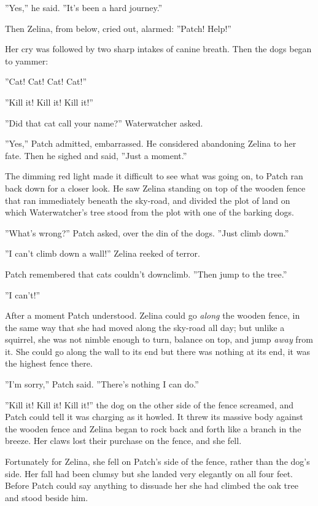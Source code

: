 \documentclass[12pt]{book}
\begin{document}
''Yes,'' he said. ''It's been a hard journey.''\par
Then Zelina, from below, cried out, alarmed: ''Patch! Help!''\par
Her cry was followed by two sharp intakes of canine breath. Then the dogs began to yammer:\par
''Cat! Cat! Cat! Cat!''\par
''Kill it! Kill it! Kill it!''\par
''Did that cat call your name?'' Waterwatcher asked.\par
''Yes,'' Patch admitted, embarrassed. He considered abandoning Zelina to her fate. Then he sighed and said, ''Just a moment.''\par
The dimming red light made it difficult to see what was going on, to Patch ran back down for a closer look. He saw Zelina standing on top of the wooden fence that ran immediately beneath the sky-road, and divided the plot of land on which Waterwatcher's tree stood from the plot with one of the barking dogs.\par
''What's wrong?'' Patch asked, over the din of the dogs. ''Just climb down.''\par
''I can't climb down a wall!'' Zelina reeked of terror.\par
Patch remembered that cats couldn't downclimb. ''Then jump to the tree.''\par
''I can't!''\par
After a moment Patch understood. Zelina could go {\it along} the wooden fence, in the same way that she had moved along the sky-road all day; but unlike a squirrel, she was not nimble enough to turn, balance on top, and jump {\it away} from it. She could go along the wall to its end %
 but there was nothing at its end, it was the highest fence there.\par
''I'm sorry,'' Patch said. ''There's nothing I can do.''\par
''Kill it! Kill it! Kill it!'' the dog on the other side of the fence screamed, and Patch could tell it was charging as it howled. It threw its massive body against the wooden fence and Zelina began to rock back and forth like a branch in the breeze. Her claws lost their purchase on the fence, and she fell.\par
Fortunately for Zelina, she fell on Patch's side of the fence, rather than the dog's side. Her fall had been clumsy but she landed very elegantly on all four feet. Before Patch could say anything to dissuade her she had climbed the oak tree and stood beside him.\par
\end{document}
